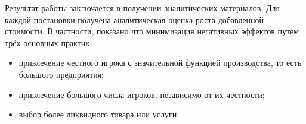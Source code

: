 Результат работы заключается в получении аналитических материалов. Для каждой постановки получена аналитическая оценка роста добавленной стоимости. В частности, показано что минимизация негативных эффектов путем трёх основных практик:

\begin{itemize}
    \item привлечение честного игрока с значительной функцией производства, то есть большого предприятия;
    \item привлечение  большого числа игроков, независимо от их честности;
    \item выбор более ликвидного товара или услуги.
\end{itemize}
 